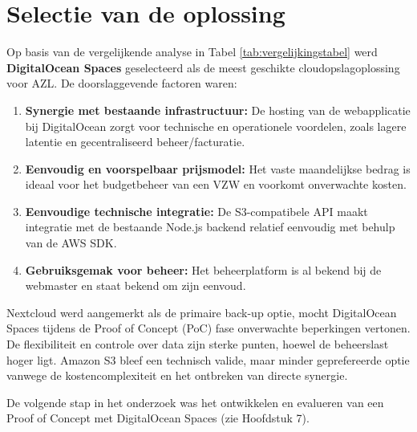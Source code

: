 \section{Selectie van de oplossing}
Op basis van de vergelijkende analyse in Tabel \ref{tab:vergelijkingstabel} werd \textbf{DigitalOcean Spaces} geselecteerd als de meest geschikte cloudopslagoplossing voor AZL. De doorslaggevende factoren waren:
\begin{enumerate}
    \item \textbf{Synergie met bestaande infrastructuur:} De hosting van de webapplicatie bij DigitalOcean zorgt voor technische en operationele voordelen, zoals lagere latentie en gecentraliseerd beheer/facturatie.
    \item \textbf{Eenvoudig en voorspelbaar prijsmodel:} Het vaste maandelijkse bedrag is ideaal voor het budgetbeheer van een VZW en voorkomt onverwachte kosten.
    \item \textbf{Eenvoudige technische integratie:} De S3-compatibele API maakt integratie met de bestaande Node.js backend relatief eenvoudig met behulp van de AWS SDK.
    \item \textbf{Gebruiksgemak voor beheer:} Het beheerplatform is al bekend bij de webmaster en staat bekend om zijn eenvoud.
\end{enumerate}

Nextcloud werd aangemerkt als de primaire back-up optie, mocht DigitalOcean Spaces tijdens de Proof of Concept (PoC) fase onverwachte beperkingen vertonen. De flexibiliteit en controle over data zijn sterke punten, hoewel de beheerslast hoger ligt. Amazon S3 bleef een technisch valide, maar minder geprefereerde optie vanwege de kostencomplexiteit en het ontbreken van directe synergie.

De volgende stap in het onderzoek was het ontwikkelen en evalueren van een Proof of Concept met DigitalOcean Spaces (zie Hoofdstuk 7).